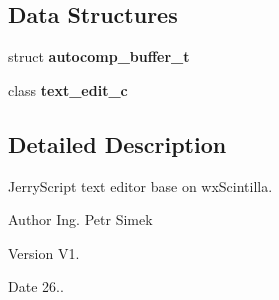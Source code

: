 \subsection*{Data Structures}
\begin{DoxyCompactItemize}
\item 
struct \textbf{ autocomp\+\_\+buffer\+\_\+t}
\item 
class \textbf{ text\+\_\+edit\+\_\+c}
\end{DoxyCompactItemize}


\subsection{Detailed Description}
Jerry\+Script text editor base on wx\+Scintilla. 

\begin{DoxyAuthor}{Author}
Ing. Petr Simek 
\end{DoxyAuthor}
\begin{DoxyVersion}{Version}
V1. 
\end{DoxyVersion}
\begin{DoxyDate}{Date}
26.. 
\end{DoxyDate}
